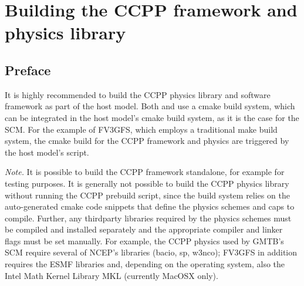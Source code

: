 \section{Building the CCPP framework and physics library}
\label{sec_ccpp_build}
\subsection{Preface}
It is highly recommended to build the CCPP physics library and software framework as part of the host model. Both  and  use a cmake build system, which can be integrated in the host model's cmake build system, as it is the case for the SCM. For the example of FV3GFS, which employs a traditional make build system, the cmake build for the CCPP framework and physics are triggered by the host model's  script.

\emph{Note.} It is possible to build the CCPP framework standalone, for example for testing purposes. It is generally not possible to build the CCPP physics library without running the CCPP prebuild script, since the build system relies on the auto-generated cmake code snippets that define the physics schemes and caps to compile. Further, any thirdparty libraries required by the physics schemes must be compiled and installed separately and the appropriate compiler and linker flags must be set manually. For example, the CCPP physics used by GMTB's SCM require several of NCEP's libraries (bacio, sp, w3nco); FV3GFS in addition requires the ESMF libraries and, depending on the operating system, also the Intel Math Kernel Library MKL (currently MacOSX only).
